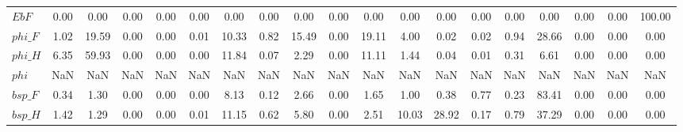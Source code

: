 \begin{center}
\begin{longtable}{lcccccccccccccccccc}
$EbF                $	 & 	             0.00	 & 	             0.00	 & 	             0.00	 & 	             0.00	 & 	             0.00	 & 	             0.00	 & 	             0.00	 & 	             0.00	 & 	             0.00	 & 	             0.00	 & 	             0.00	 & 	             0.00	 & 	             0.00	 & 	             0.00	 & 	             0.00	 & 	             0.00	 & 	             0.00	 & 	           100.00 \\ 
$phi\_F             $	 & 	             1.02	 & 	            19.59	 & 	             0.00	 & 	             0.00	 & 	             0.01	 & 	            10.33	 & 	             0.82	 & 	            15.49	 & 	             0.00	 & 	            19.11	 & 	             4.00	 & 	             0.02	 & 	             0.02	 & 	             0.94	 & 	            28.66	 & 	             0.00	 & 	             0.00	 & 	             0.00 \\ 
$phi\_H             $	 & 	             6.35	 & 	            59.93	 & 	             0.00	 & 	             0.00	 & 	             0.00	 & 	            11.84	 & 	             0.07	 & 	             2.29	 & 	             0.00	 & 	            11.11	 & 	             1.44	 & 	             0.04	 & 	             0.01	 & 	             0.31	 & 	             6.61	 & 	             0.00	 & 	             0.00	 & 	             0.00 \\ 
$phi                $	 & 	              NaN	 & 	              NaN	 & 	              NaN	 & 	              NaN	 & 	              NaN	 & 	              NaN	 & 	              NaN	 & 	              NaN	 & 	              NaN	 & 	              NaN	 & 	              NaN	 & 	              NaN	 & 	              NaN	 & 	              NaN	 & 	              NaN	 & 	              NaN	 & 	              NaN	 & 	              NaN \\ 
$bsp\_F             $	 & 	             0.34	 & 	             1.30	 & 	             0.00	 & 	             0.00	 & 	             0.00	 & 	             8.13	 & 	             0.12	 & 	             2.66	 & 	             0.00	 & 	             1.65	 & 	             1.00	 & 	             0.38	 & 	             0.77	 & 	             0.23	 & 	            83.41	 & 	             0.00	 & 	             0.00	 & 	             0.00 \\ 
$bsp\_H             $	 & 	             1.42	 & 	             1.29	 & 	             0.00	 & 	             0.00	 & 	             0.01	 & 	            11.15	 & 	             0.62	 & 	             5.80	 & 	             0.00	 & 	             2.51	 & 	            10.03	 & 	            28.92	 & 	             0.17	 & 	             0.79	 & 	            37.29	 & 	             0.00	 & 	             0.00	 & 	             0.00 \\ 

\end{longtable}
\end{center}
